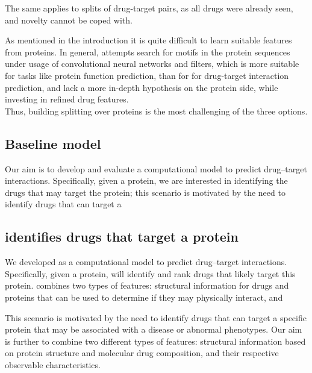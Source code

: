 \documentclass{bioinfo}
\begin{document}
The same applies to splits of drug-target pairs, as all drugs were already seen, and novelty cannot be coped with.

As mentioned in the introduction it is quite difficult to learn suitable features from proteins. In general, attempts search for motifs in the protein sequences under usage of convolutional neural networks and filters, which is more suitable for tasks like protein function prediction, than for for drug-target interaction prediction, and lack a more in-depth hypothesis on the protein side, while investing in refined drug features. \\
Thus, building splitting over proteins is the most challenging of the three options. \\



\subsection{Baseline model}
Our aim is to develop and evaluate a computational model to predict
drug--target interactions. Specifically, given a protein, we are
interested in identifying the drugs that may target the protein; this
scenario is motivated by the need to identify drugs that can target a

\subsection{\name identifies drugs that target a protein}

We developed \name as a computational model to predict drug--target
interactions. Specifically, given a protein, \name will identify and
rank drugs that likely target this protein. \name combines two 
types of features: structural information for drugs and proteins that
can be used to determine if they may physically interact, and 

This scenario is motivated by the need to identify drugs that can target a
specific protein that may be associated with a disease or abnormal
phenotypes.
Our aim is further to combine two different types of features:
structural information based on protein structure and molecular drug composition, and their respective observable characteristics.
\end{document}
